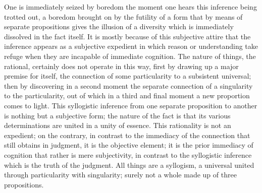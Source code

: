One is immediately seized by boredom the moment
one hears this inference being trotted out,
a boredom brought on by the futility of a form
that by means of separate propositions
gives the illusion of a diversity
which is immediately dissolved in the fact itself.
It is mostly because of this subjective attire
that the inference appears as a subjective expedient
in which reason or understanding take refuge
when they are incapable of immediate cognition.
The nature of things, the rational,
certainly does not operate in this way,
first by drawing up a major premise for itself,
the connection of some particularity to a subsistent universal;
then by discovering in a second moment the separate connection
of a singularity to the particularity,
out of which in a third and final moment
a new proportion comes to light.
This syllogistic inference from
one separate proposition to another is
nothing but a subjective form;
the nature of the fact is that
its various determinations are
united in a unity of essence.
This rationality is not an expedient;
on the contrary, in contrast to the
immediacy of the connection
that still obtains in judgment,
it is the objective element;
it is the prior immediacy of cognition
that rather is mere subjectivity,
in contrast to the syllogistic inference
which is the truth of the judgment.
All things are a syllogism,
a universal united through particularity with singularity;
surely not a whole made up of three propositions.

